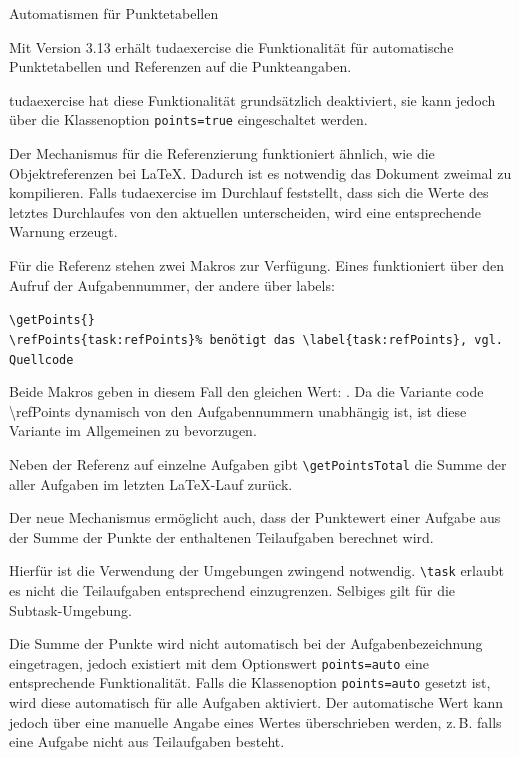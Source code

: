 \documentclass[
	ngerman,%
	accentcolor=9c,%
	points=true, für die Aktivierung der Punktereferenzen
]{tudaexercise}
\newcommand*{\code}[1]{\texttt{#1}}
\newcommand*{\cls}[1]{\textsf{#1}}
\let\tbs\textbackslash
\begin{document}
\begin{task}[points=auto]{Automatismen für Punktetabellen}
	\label{task:refPoints}

	Mit Version 3.13 erhält  \cls{tudaexercise} die Funktionalität für automatische Punktetabellen und Referenzen auf die Punkteangaben.

	\begin{subtask}[points=3,title={Referenzen aktivieren}]
		\cls{tudaexercise} hat diese Funktionalität grundsätzlich deaktiviert, sie kann jedoch über die Klassenoption \code{points=true} eingeschaltet werden.

		Der Mechanismus für die Referenzierung funktioniert ähnlich, wie die Objektreferenzen bei \LaTeX{}. Dadurch ist es notwendig das Dokument zweimal zu kompilieren. Falls \cls{tudaexercise} im Durchlauf feststellt, dass sich die Werte des letztes Durchlaufes von den aktuellen unterscheiden, wird eine entsprechende Warnung erzeugt.

		Für die Referenz stehen zwei Makros zur Verfügung. Eines funktioniert über den Aufruf der Aufgabennummer, der andere über labels:

		\verb+\getPoints{+\thetask\verb+}+\\
		\verb+\refPoints{task:refPoints}% benötigt das \label{task:refPoints}, vgl. Quellcode+

		Beide Makros geben in diesem Fall den gleichen Wert: . Da die Variante code {\tbs{}refPoints} dynamisch von den Aufgabennummern unabhängig ist, ist diese Variante im Allgemeinen zu bevorzugen.

		Neben der Referenz auf einzelne Aufgaben gibt \code{\tbs{}getPointsTotal} die Summe der aller Aufgaben im letzten \LaTeX-Lauf zurück.

	\end{subtask}

	\begin{subtask}[points=2,title={Punkte aus Teilaufgaben aufsummieren}]
		Der neue Mechanismus ermöglicht auch, dass der Punktewert einer Aufgabe aus der Summe der Punkte der enthaltenen Teilaufgaben berechnet wird.

		Hierfür ist die Verwendung der Umgebungen zwingend notwendig. \code{\tbs{}task} erlaubt es nicht die Teilaufgaben entsprechend einzugrenzen. Selbiges gilt für die Subtask-Umgebung.

		Die Summe der Punkte wird nicht automatisch bei der Aufgabenbezeichnung eingetragen, jedoch existiert mit dem Optionswert \code{points=auto} eine entsprechende Funktionalität.
		Falls die Klassenoption \code{points=auto} gesetzt ist, wird diese automatisch für alle Aufgaben aktiviert. Der automatische Wert kann jedoch über eine manuelle Angabe eines Wertes überschrieben werden, z.\,B. falls eine Aufgabe nicht aus Teilaufgaben besteht.


\end{subtask}
\end{task}
\end{document}
